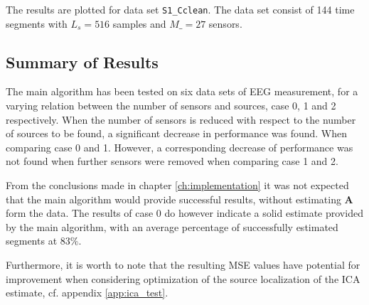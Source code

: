 The results are plotted for data set \texttt{S1\_Cclean}. 
The data set consist of 144 time segments with $L_s = 516$ samples and $M\_ = 27$ sensors. 
 
\subsection{Summary of Results}
The main algorithm has been tested on six data sets of EEG measurement, for a varying relation between the number of sensors and sources, case 0, 1 and 2 respectively.
When the number of sensors is reduced with respect to the number of sources to be found, a significant decrease in performance was found. When comparing case 0 and 1. 
However, a corresponding decrease of performance was not found when further sensors were removed when comparing case 1 and 2. 

From the conclusions made in chapter \ref{ch:implementation} it was not expected that the main algorithm would provide successful results, without estimating $\mathbf{A}$ form the data. 
The results of case 0 do however indicate a solid estimate provided by the main algorithm, with an average percentage of successfully estimated segments at $83\%$. 

Furthermore, it is worth to note that the resulting MSE values have potential for improvement when considering optimization of the source localization of the ICA estimate, cf. appendix \ref{app:ica_test}.





